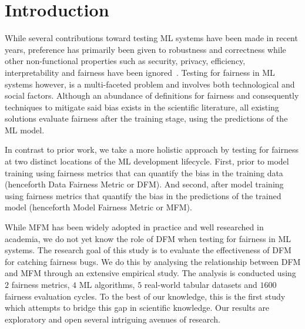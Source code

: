 \documentclass[sigconf,review]{acmart}
\begin{document}
\section{Introduction}\label{sec:intro}

While several contributions toward testing ML systems have been made
in recent years, preference has primarily been given to robustness and
correctness while other non-functional properties such as security,
privacy, efficiency, interpretability and fairness have been
ignored \cite{zhang2020machine,zhang2021ignorance,mehrabi2021survey,wan2021modeling}.
Testing for fairness in ML systems however, is a multi-faceted problem
and involves both technological and social factors. Although an
abundance of definitions for fairness and consequently techniques to
mitigate said bias exists in the scientific literature, all existing
solutions evaluate fairness after the training stage, using the
predictions of the ML model.

In contrast to prior work, we take a more holistic approach by testing
for fairness at two distinct locations of the ML development
lifecycle. First, prior to model training using fairness metrics that
can quantify the bias in the training data (henceforth Data Fairness
Metric or DFM). And second, after model training using fairness
metrics that quantify the bias in the predictions of the trained model
(henceforth Model Fairness Metric or MFM).

While MFM has been widely adopted in practice and well researched in
academia, we do not yet know the role of DFM when testing for fairness
in ML systems. The research goal of this study is to evaluate the
effectiveness of DFM for catching fairness bugs. We do this by
analysing the relationship between DFM and MFM through an extensive
empirical study. The analysis is conducted using $2$ fairness metrics,
$4$ ML algorithms, $5$ real-world tabular datasets and $1600$ fairness
evaluation cycles. To the best of our knowledge, this is the first
study which attempts to bridge this gap in scientific knowledge. Our
results are exploratory and open several intriguing avenues of
research.
\end{document}
